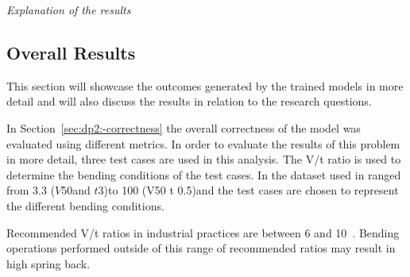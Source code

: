 %

\textit{Explanation of the results}

\subsection{Overall Results}\label{subsec:overall-results}
This section will showcase the outcomes generated by the trained models in more detail and
will also discuss the results in relation to the research questions.

In Section~\ref{sec:dp2:-correctness} the overall correctness of the model was
evaluated using different metrics.
In order to evaluate the results of this problem in more detail, three test cases are used
in this analysis.
The V/t ratio is used to determine the bending conditions of the test cases. In the
dataset used in ranged from 3.3 (\(V 50\)and \(t 3\))to 100 (V50 t 0.5)and the test
cases are chosen to represent the different bending conditions.

Recommended V/t ratios in industrial practices are between 6 and 10~\cite[p.7]{
    cruz_applicationmachinelearning_2021}.
Bending operations performed outside of this range of recommended ratios may result in
high spring back.

